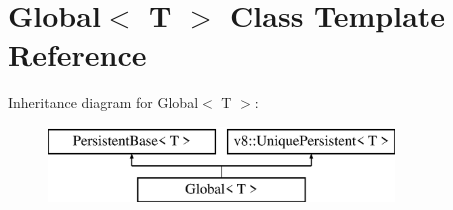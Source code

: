 \hypertarget{class_global}{}\section{Global$<$ T $>$ Class Template Reference}
\label{class_global}
Inheritance diagram for Global$<$ T $>$\+:\begin{figure}[H]
\begin{center}
\leavevmode
\includegraphics[height=2.000000cm]{class_global}
\end{center}
\end{figure}
